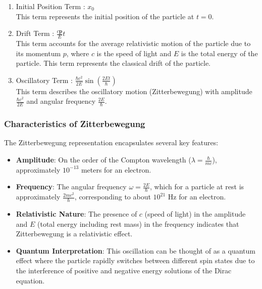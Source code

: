 \documentclass[%
 reprint,
 amsmath,amssymb,
 aps,
]{revtex4-1}
\numberwithin{equation}{section}%
\begin{document}
\begin{enumerate}
    \item Initial Position Term : $x_0$ \\
        This term represents the initial position of the particle at $t=0$.
    \item Drift Term : $\frac{c\mathbf{p}}{E}t$ \\
        This term accounts for the average relativistic motion of the particle due to its momentum $p$, where $c$ is the speed of light and $E$ is the total energy of the particle. This term represents the classical drift of the particle.
    \item Oscillatory Term : $\frac{\hbar c^2}{2E}\sin\left(\frac{2Et}{\hbar}\right)$ \\
        This term describes the oscillatory motion (Zitterbewegung) with amplitude $\frac{\hbar c^2}{2E}$ and angular frequency $\frac{2E}{\hbar}$.
\end{enumerate}

\subsubsection{\label{sec:haracteristics of Zitterbewegung}Characteristics of Zitterbewegung}

The Zitterbewegung representation encapsulates several key features:

\begin{itemize}
    \item \textbf{Amplitude}: On the order of the Compton wavelength ($\lambda = \frac{\hbar}{mc}$), approximately $10^{-13}$ meters for an electron.
    
    \item \textbf{Frequency}: The angular frequency $\omega = \frac{2E}{\hbar}$, which for a particle at rest is approximately $\frac{2mc^2}{\hbar}$, corresponding to about $10^{21}$ Hz for an electron.
    
    \item \textbf{Relativistic Nature}: The presence of $c$ (speed of light) in the amplitude and $E$ (total energy including rest mass) in the frequency indicates that Zitterbewegung is a relativistic effect.
    
    \item \textbf{Quantum Interpretation}: This oscillation can be thought of as a quantum effect where the particle rapidly switches between different spin states due to the interference of positive and negative energy solutions of the Dirac equation.
\end{itemize}
\end{document}
